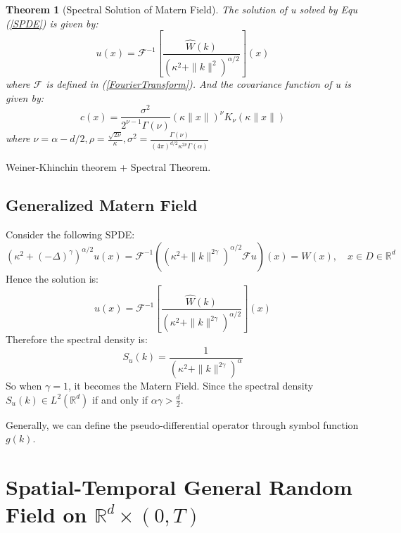 \documentclass{article}
\newtheorem{theorem}{Theorem}
\begin{document}
\begin{theorem}[Spectral Solution of Matern Field]\label{spectral_solution_matern}
	The solution of u solved by Equ (\ref{SPDE}) is given by:
	\begin{equation}
		u(x) = \mathcal{F}^{-1}\left[\frac{\hat{W}(k)}{(\kappa^2 + \|k\|^2)^{\alpha/2}}\right](x)
	\end{equation}
	where $\mathcal{F}$ is defined in (\ref{FourierTransform}).
	And the covariance function of u is given by:
	\begin{equation}
		c(x) = \frac{\sigma^2}{2^{\nu -1}\Gamma(\nu)}(\kappa \|x\|)^\nu K_\nu (\kappa \|x\|)
	\end{equation}
	where $\nu = \alpha - d/2, \rho = \frac{\sqrt{2\nu}}{\kappa}, \sigma^2 = \frac{\Gamma(\nu)}{(4\pi)^{d/2}\kappa^{2\nu}\Gamma(\alpha) }$
\end{theorem}



Weiner-Khinchin theorem + Spectral Theorem.
\subsection{Generalized Matern Field}
Consider the following SPDE:
\begin{equation}\label{GWM}
	(\kappa^2 +(- \Delta)^{\gamma})^{\alpha/2}u(x)=\mathcal{F}^{-1}\left((\kappa^2 + \|k\|^{2\gamma})^{\alpha/2}\mathcal{F}u\right)(x) = W(x), \quad x\in D\in \mathbb{R}^d
\end{equation}
Hence the solution is:
\begin{equation}
	u(x)=\mathcal{F}^{-1}\left[\frac{\hat{W}(k)}{(\kappa^2 + \|k\|^{2\gamma})^{\alpha/2}}\right](x)
\end{equation}
Therefore the spectral density is:
\begin{equation}
	S_u(k)=\frac{1}{(\kappa^2 + \|k\|^{2\gamma})^{\alpha}}
\end{equation}
So when $\gamma = 1$, it becomes the Matern Field. Since  the spectral density $S_u(k)\in L^2(\mathbb{R}^d)$ if and only if $\alpha \gamma > \frac{d}{2}$.

Generally, we can define the pseudo-differential operator through symbol function $g(k)$.
\section{Spatial-Temporal General Random Field on $\mathbb{R}^d\times (0, T)$}
\end{document}
